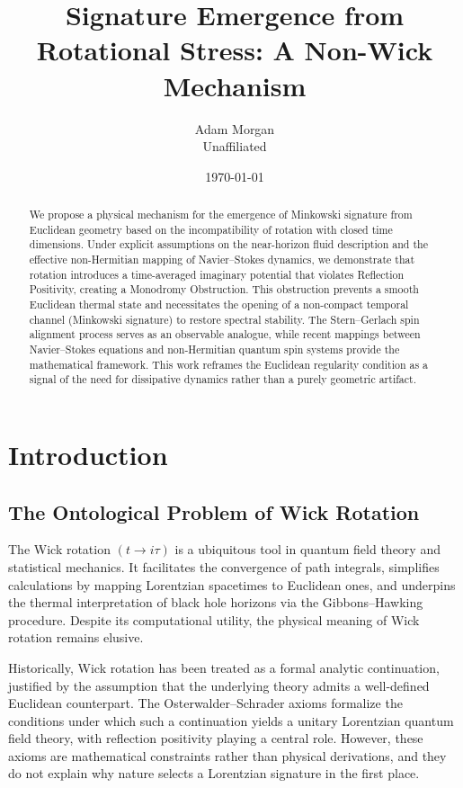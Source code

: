 \documentclass[11pt]{article}
\title{Signature Emergence from Rotational Stress: A Non-Wick Mechanism}
\author{Adam Morgan\\
\small Unaffiliated}
\date{\today}
\begin{document}
\maketitle

\begin{abstract}
We propose a physical mechanism for the emergence of Minkowski signature from Euclidean geometry based on the incompatibility of rotation with closed time dimensions. Under explicit assumptions on the near-horizon fluid description and the effective non-Hermitian mapping of Navier–Stokes dynamics, we demonstrate that rotation introduces a time-averaged imaginary potential that violates Reflection Positivity, creating a Monodromy Obstruction. This obstruction prevents a smooth Euclidean thermal state and necessitates the opening of a non-compact temporal channel (Minkowski signature) to restore spectral stability. The Stern–Gerlach spin alignment process serves as an observable analogue, while recent mappings between Navier–Stokes equations and non-Hermitian quantum spin systems provide the mathematical framework. This work reframes the Euclidean regularity condition as a signal of the need for dissipative dynamics rather than a purely geometric artifact.
\end{abstract}

\section{Introduction}


\subsection{The Ontological Problem of Wick Rotation}

The Wick rotation $(t \to i\tau)$ is a ubiquitous tool in quantum field theory and statistical mechanics. It facilitates the convergence of path integrals, simplifies calculations by mapping Lorentzian spacetimes to Euclidean ones, and underpins the thermal interpretation of black hole horizons via the Gibbons--Hawking procedure. Despite its computational utility, the physical meaning of Wick rotation remains elusive.

Historically, Wick rotation has been treated as a formal analytic continuation, justified by the assumption that the underlying theory admits a well-defined Euclidean counterpart. The Osterwalder--Schrader axioms formalize the conditions under which such a continuation yields a unitary Lorentzian quantum field theory, with reflection positivity playing a central role. However, these axioms are mathematical constraints rather than physical derivations, and they do not explain why nature selects a Lorentzian signature in the first place.
\end{document}
